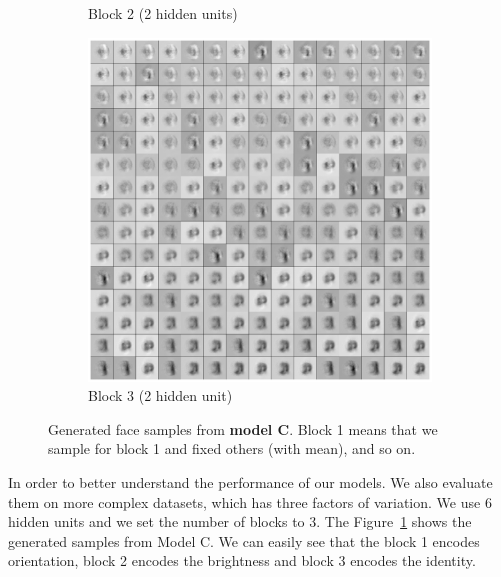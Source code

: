 \begin{figure}
\begin{subfigure}[b]{0.5\textwidth}
    \vspace{-2\baselineskip}
    \caption{Block 2 (2 hidden units)}
    \end{subfigure}
    \begin{subfigure}[b]{0.5\textwidth}
    \includegraphics[width=\textwidth]{images/norbNWblock3sample.eps}
    \vspace{-2\baselineskip}
    \caption{Block 3 (2 hidden unit)}
    \end{subfigure}
    \caption{Generated face samples from \textbf{model C}. Block 1 means that we sample for block 1 and fixed others (with mean), and so on.}\label{fig:animals}
    \label{fig:norbsamples}
\end{figure}

In order to better understand the performance of our models. We also evaluate them on more complex datasets, which has three factors of variation. We use $6$ hidden units and we set the number of blocks to $3$. The Figure~\ref{fig:norbsamples} shows the generated samples from Model C. We can easily see that the block 1 encodes orientation, block 2 encodes the brightness and block 3 encodes the identity. 
 